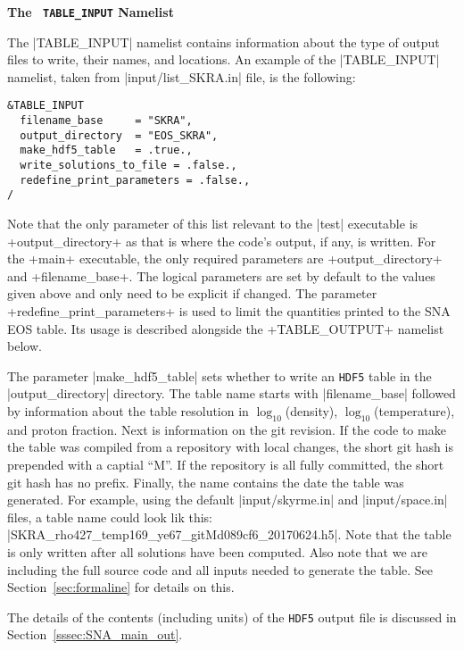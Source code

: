 \documentclass[letterpaper,11pt]{refart}
\begin{document}
\bigskip

\textbf{The \texttt{\color{cyan} TABLE\_INPUT} Namelist}


The \verbnml|TABLE_INPUT| namelist contains information about the type
of output files to write, their names, and locations.  An example of
the \verbnml|TABLE_INPUT| namelist, taken from
\verbfile|input/list_SKRA.in| file, is the following:

{\color{cyan}
\begin{verbatim}
&TABLE_INPUT
  filename_base     = "SKRA",
  output_directory  = "EOS_SKRA",
  make_hdf5_table   = .true.,
  write_solutions_to_file = .false.,
  redefine_print_parameters = .false.,
/
\end{verbatim}}
Note that the only parameter of this list relevant to the
\verbexec|test| executable is \verbprm+output_directory+ as that is
where the code's output, if any, is written.  For the \verbexec+main+
executable, the only required parameters are
\verbprm+output_directory+ and
\verbprm+filename_base+. The logical parameters are set by default to
the values given above and only need to be explicit if changed. The
parameter \verbprm+redefine_print_parameters+ is used to limit the
quantities printed to the SNA EOS table. Its usage is described
alongside the \verbnml+TABLE_OUTPUT+ namelist below.


The parameter \verbprm|make_hdf5_table| sets whether to write an 
\verb|HDF5| table in the \verbfile|output_directory| directory.  
The table name starts with \verbprm|filename_base| followed by 
information about the table resolution in $\log_{10}$(density), 
$\log_{10}$(temperature), and proton fraction. Next is information on 
the git revision. If the code to make the table was compiled from a 
repository with local changes, the short git hash is prepended with a 
captial ``M''. If the repository is all fully committed, the short git 
hash has no prefix. Finally, the name contains the date the table was
generated. For example, using the default
\verbfile|input/skyrme.in| and \verbfile|input/space.in| files,
a table name could look lik this:
\verbfile|SKRA_rho427_temp169_ye67_gitMd089cf6_20170624.h5|.  Note
that the table is only written after all solutions have been
computed. Also note that we are including the full source code and all
inputs needed to generate the table. See Section~\ref{sec:formaline}
for details on this. 


The details of the contents (including units) of the \verb|HDF5| output file 
is discussed in Section~\ref{sssec:SNA_main_out}.
\end{document}
